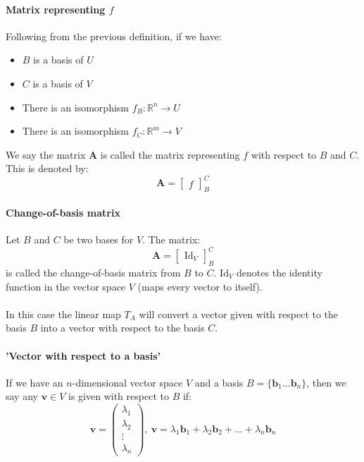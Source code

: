 \documentclass{scrartcl}
\newcommand{\R}{\mathbb{R}}
\renewcommand{\vec}[1]{\mathbf{#1}}
\begin{document}
\paragraph{Matrix representing $ f $}
Following from the previous definition, if we have:
\begin{itemize}
\item $ B $ is a basis of $ U $
\item $ C $ is a basis of $ V $
\item There is an isomorphism $ f_{B} : \R^{n} \to U $
\item There is an isomorphism $ f_{C} : \R^{m} \to V $
\end{itemize}
We say the matrix $ \vec{A} $ is called the matrix representing $ f $ with respect to $ B $ and $ C $. This is denoted by:
\begin{equation}
\vec{A} =
\begin{bmatrix}
f
\end{bmatrix}_{B}^{C}
\end{equation}
\paragraph{Change-of-basis matrix}
Let $ B $ and $ C $ be two bases for $ V $. The matrix:
\begin{equation}
\vec{A} =
\begin{bmatrix}
\textrm{Id}_{V}
\end{bmatrix}_{B}^{C}
\end{equation}
is called the change-of-basis matrix from $ B $ to $ C $. $ \textrm{Id}_{V} $ denotes the identity function in the vector space $ V $ (maps every vector to itself).
\\\\
In this case the linear map $ T_{A} $ will convert a vector given with respect to the basis $ B $ into a vector with respect to the basis $ C $.
\paragraph{'Vector with respect to a basis'}
If we have an $ n $-dimensional vector space $ V $ and a basis $ B = \{\vec{b}_{1} ... \vec{b}_{n} \} $, then we say any $ \vec{v} \in V $  is given with respect to $ B $ if:
\begin{equation}
\vec{v} = 
\begin{pmatrix}
\lambda_{1} \\ \lambda_{2} \\ \vdots \\ \lambda_{n}
\end{pmatrix} , \ 
\vec{v} = \lambda_{1}\vec{b}_{1} + \lambda_{2}\vec{b}_{2} + ... + \lambda_{n}\vec{b}_{n}
\end{equation}
\end{document}
